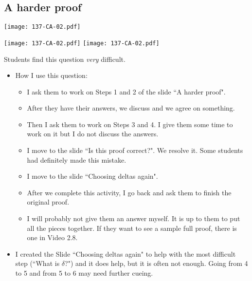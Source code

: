 \documentclass[11pt]{article}
\newcommand{\n}{\newpage}
\newcommand{\nl}{\hfill \vspace{-1.1\baselineskip}} %
\begin{document}
\n
\newpage
\subsection{A harder proof}

\begin{center}
{ \texttt{[image: 137-CA-02.pdf]}}

{ \texttt{[image: 137-CA-02.pdf]}}
\quad
{ \texttt{[image: 137-CA-02.pdf]}}
\end{center}

\vspace{-2mm}

\begin{warning}
Students find this question \emph{very} difficult.
\end{warning}

\vspace{-2mm}
\begin{comments}
\nl
	\begin{itemize}
		\item  How I use this question:
			\begin{itemize}
				\item I ask them to work on Steps 1 and 2 of the slide ``A harder proof".
				\item After they have their answers, we discuss and we agree on something.
				\item Then I ask them to work on Steps 3 and 4.  I give them some time to work on it but I do not discuss the answers.
				\item I move to the slide ``Is this proof correct?".  We resolve it.   Some students had definitely made this mistake.
				\item  I move to the slide ``Choosing deltas again".
				\item After we complete this activity, I go back and ask them to finish the original proof.  
				\item I will probably not give them an answer myself.  It is up to them to put all the pieces together.  If they want to see a sample full proof, there is one in Video 2.8.
			\end{itemize}
		\item %
		I created the Slide ``Choosing deltas again" to help with the most difficult step (``What is $\delta$?") and it does help, but it is often not enough.  Going from 4 to 5 and from 5 to 6 may need further cueing.
	\end{itemize}
\end{comments}
\end{document}
